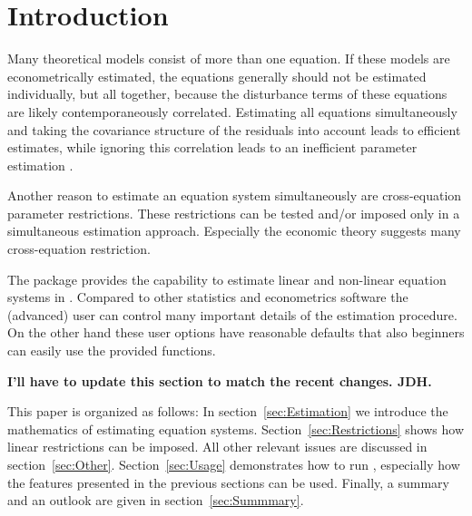\section{Introduction}

Many theoretical models consist of more than one equation. If these
models are econometrically estimated, the equations generally should
not be estimated individually, but all together, because the
disturbance terms of these equations are likely contemporaneously
correlated. Estimating all equations simultaneously and taking the
covariance structure of the residuals into account leads to efficient
estimates, while ignoring this correlation leads to an inefficient
parameter estimation \citep{zellner62}.

Another reason to estimate an equation system simultaneously are
cross-equation parameter restrictions. These restrictions can be
tested and/or imposed only in a simultaneous estimation
approach. Especially the economic theory suggests many cross-equation
restriction.

The  package provides the capability to estimate
linear and non-linear equation systems in . Compared to
other statistics and econometrics software the (advanced) user can
control many important details of the estimation procedure. On the
other hand these user options have reasonable defaults that also
beginners can easily use the provided functions.

\textbf{I'll have to update this section to match the recent changes. JDH.}

This paper is organized as follows: In section~\ref{sec:Estimation} we
introduce the mathematics of estimating equation systems.
Section~\ref{sec:Restrictions} shows how linear restrictions can be
imposed.
All other relevant issues are discussed in section~\ref{sec:Other}.
Section~\ref{sec:Usage} demonstrates how to run
, especially how the features presented in the previous
sections can be used.
Finally, a summary and an outlook are given in
section~\ref{sec:Summmary}.

